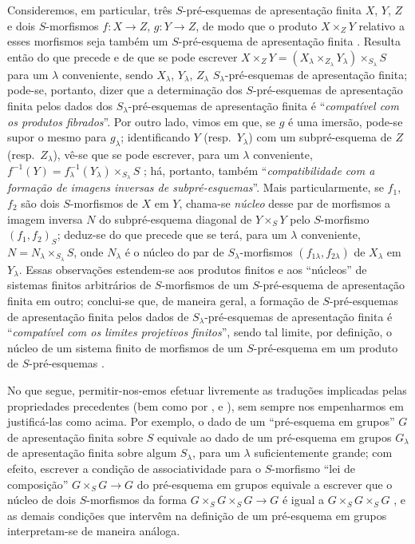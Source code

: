 \begin{env}[8.8.3]
Consideremos, em particular, três $S$-pré-esquemas de apresentação finita $X$, $Y$, $Z$ e dois $S$-morfismos $f:X\to Z$, $g:Y\to Z$, de modo que o produto $X\times_Z Y$ relativo a esses morfismos seja também um $S$-pré-esquema de apresentação finita .
Resulta então do que precede e de  que se pode escrever $X\times_Z Y=(X_\lambda\times_{Z_\lambda}Y_\lambda)\times_{S_\lambda}S$ para um $\lambda$ conveniente, sendo $X_\lambda$, $Y_\lambda$, $Z_\lambda$ $S_\lambda$-pré-esquemas de apresentação finita; pode-se, portanto, dizer que a determinação dos $S$-pré-esquemas de apresentação finita pelos dados dos $S_\lambda$-pré-esquemas de apresentação finita é ``\emph{compatível com os produtos fibrados}''.
Por outro lado, vimos em  que, se $g$ é uma imersão, pode-se supor o mesmo para $g_\lambda$; identificando $Y$ (resp.\ $Y_\lambda$) com um subpré-esquema de $Z$ (resp.\ $Z_\lambda$), vê-se que se pode escrever, para um $\lambda$ conveniente, $f^{-1}(Y)=f_\lambda^{-1}(Y_\lambda)\times_{S_\lambda}S$ ;
há, portanto, também ``\emph{compatibilidade com a formação de imagens inversas de subpré-esquemas}''.
Mais particularmente, se $f_1$, $f_2$ são dois $S$-morfismos de $X$ em $Y$, chama-se \emph{núcleo} desse par de morfismos a imagem inversa $N$ do subpré-esquema diagonal de $Y\times_S Y$ pelo $S$-morfismo $(f_1,f_2)_S$; deduz-se do que precede que se terá, para um $\lambda$ conveniente, $N=N_\lambda\times_{S_\lambda}S$, onde $N_\lambda$ é o núcleo do par de $S_\lambda$-morfismos $(f_{1\lambda},f_{2\lambda})$ de $X_\lambda$ em $Y_\lambda$.
Essas observações estendem-se aos produtos finitos e aos ``núcleos'' de sistemas finitos arbitrários de $S$-morfismos de um $S$-pré-esquema de apresentação finita em
outro; conclui-se que, de maneira geral, a formação de $S$-pré-esquemas de apresentação finita pelos dados de $S_\lambda$-pré-esquemas de apresentação finita é ``\emph{compatível com os limites projetivos finitos}'', sendo tal limite, por definição, o núcleo de um sistema finito de morfismos de um $S$-pré-esquema em um produto de $S$-pré-esquemas .

No que segue, permitir-nos-emos efetuar livremente as traduções implicadas pelas propriedades precedentes (bem como por ,  e ), sem sempre nos empenharmos em justificá-las como acima.
Por exemplo, o dado de um ``pré-esquema em grupos'' $G$ de apresentação finita sobre $S$ equivale ao dado de um pré-esquema em grupos $G_\lambda$ de apresentação finita sobre algum $S_\lambda$, para um $\lambda$ suficientemente grande; com efeito, escrever a condição de associatividade para o $S$-morfismo ``lei de composição'' $G\times_S G\to G$ do pré-esquema em grupos equivale a escrever que o núcleo de dois $S$-morfismos da forma $G\times_S G\times_S G\to G$ é igual a $G\times_S G\times_S G$ , e as demais condições que intervêm na definição de um pré-esquema em grupos interpretam-se de maneira análoga.
\end{env}

